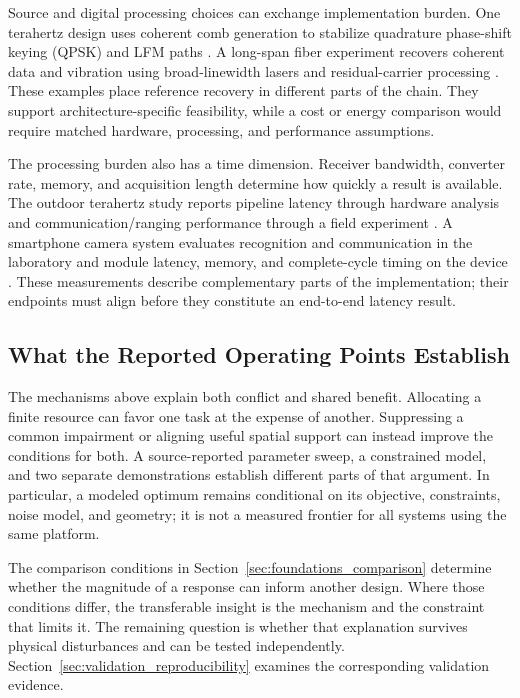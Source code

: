 Source and digital processing choices can exchange implementation burden. One
terahertz design uses coherent comb generation to stabilize quadrature
phase-shift keying (QPSK) and LFM paths
\cite{OISAC_SCR01000}. A long-span fiber experiment recovers coherent data and
vibration using broad-linewidth lasers and residual-carrier processing
\cite{OISAC_SCR01070}. These examples place reference recovery in different
parts of the chain. They support architecture-specific feasibility, while a
cost or energy comparison would require matched hardware, processing, and
performance assumptions.

The processing burden also has a time dimension. Receiver bandwidth, converter
rate, memory, and acquisition length determine how quickly a result is
available. The outdoor terahertz study reports pipeline latency through
hardware analysis and communication/ranging performance through a field
experiment \cite{OISAC_SCR01054}. A smartphone camera system evaluates
recognition and communication in the laboratory and module latency, memory,
and complete-cycle timing on the device \cite{OISAC_SCR00833}. These
measurements describe complementary parts of the implementation; their
endpoints must align before they constitute an end-to-end latency result.

\subsection{What the Reported Operating Points Establish}

The mechanisms above explain both conflict and shared benefit. Allocating a
finite resource can favor one task at the expense of another. Suppressing a
common impairment or aligning useful spatial support can instead improve the
conditions for both. A source-reported parameter sweep, a constrained model,
and two separate demonstrations establish different parts of that argument.
In particular, a modeled optimum remains conditional on its objective,
constraints, noise model, and geometry; it is not a measured frontier for all
systems using the same platform.

The comparison conditions in Section~\ref{sec:foundations_comparison} determine
whether the magnitude of a response can inform another design. Where those
conditions differ, the transferable insight is the mechanism and the constraint
that limits it. The remaining question is whether that explanation survives
physical disturbances and can be tested independently.
Section~\ref{sec:validation_reproducibility} examines the corresponding
validation evidence.
